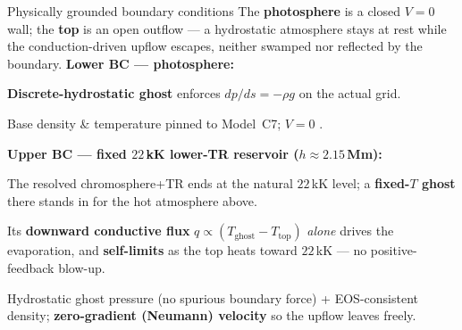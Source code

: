 \documentclass[final, dvipsnames, 20pt]{beamer}
\newlength{\colwidth}
\newcommand{\mz}[1]{{\color{Blue}\textbf{#1}}}     %
\newcommand{\rd}[1]{{\color{TappanRed}\textbf{#1}}} %
\begin{document}
\begin{frame}[t]
\begin{columns}[t]
\begin{column}{\colwidth}
\begin{block}{Physically grounded boundary conditions}
The \mz{photosphere} is a closed $V{=}0$ wall; the \mz{top} is an open outflow
--- a hydrostatic atmosphere stays at rest while the conduction-driven upflow
escapes, neither swamped nor reflected by the boundary.
\textbf{Lower BC --- photosphere:}
\begin{compactitem}
  \item \mz{Discrete-hydrostatic ghost} enforces $dp/ds=-\rho g$ on the actual grid.
  \item Base density \& temperature pinned to Model~C7; $V{=}0$ \parencite{Pandey2024}.
\end{compactitem}
\textbf{Upper BC --- fixed $22$\,kK lower-TR reservoir ($h\approx2.15$\,Mm):}
\begin{compactitem}
  \item The resolved chromosphere+TR ends at the natural $22$\,kK level; a
        \mz{fixed-$T$ ghost} there stands in for the hot atmosphere above.
  \item Its \rd{downward conductive flux} $q\propto(T_\mathrm{ghost}-T_\mathrm{top})$
        \emph{alone} drives the evaporation, and \mz{self-limits} as the top heats
        toward $22$\,kK --- no positive-feedback blow-up.
  \item Hydrostatic ghost pressure (no spurious boundary force) + EOS-consistent
        density; \mz{zero-gradient (Neumann) velocity} so the upflow leaves freely.
\end{compactitem}
\end{block}


\end{column}
\end{columns}
\end{frame}
\end{document}
